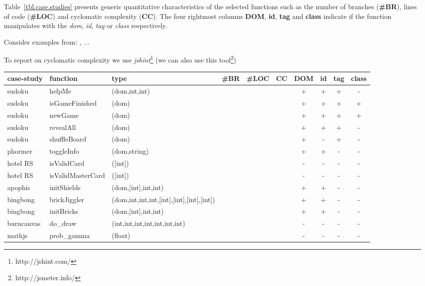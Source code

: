 \documentclass[sigconf]{acmart}
\begin{document}
Table~\ref{tbl.case.studies} presents generic quantitative characteristics of the selected functions such as the number of branches (\textbf{\#BR}), lines of code (\textbf{\#LOC}) and cyclomatic complexity (\textbf{CC}). The four rightmost columns \textbf{DOM}, \textbf{id}, \textbf{tag} and \textbf{class} indicate if the function manipulates with the \emph{dom}, \emph{id}, \emph{tag} or \emph{class} respectively.       


Consider examples from: \cite{artemis2011}, \cite{dom2011}...

To report on cyclomatic complexity we use \emph{jshint}\footnote{http://jshint.com/} (we can also use this tool\footnote{http://jsmeter.info/})

\begin{table*}
  \caption{Summary of the case studies}
  \label{tbl.case.studies}
    \footnotesize
  \begin{tabular}{l|l|l|r|r|r|c|c|c|c}
    \toprule
    \textbf{case-study} & \textbf{function} & \textbf{type} & \textbf{\#BR} & \textbf{\#LOC} & \textbf{CC} & \textbf{DOM} & \textbf{id} & \textbf{tag} & \textbf{class} \\
    \midrule
    sudoku     & helpMe & (dom,int,int) & & & & + & + & + & - \\
    sudoku     & isGameFinished & (dom) & & & & + & + & + & + \\
    sudoku     & newGame & (dom)        & & & & + & + & + & + \\
    sudoku     & revealAll & (dom)      & & & & + & + & + & - \\
    sudoku     & shuffleBoard & (dom)   & & & & + & - & + & - \\
    \midrule
    phormer    & toggleInfo & (dom,string) & & & & + & + & - & - \\
    \midrule
    hotel RS   & isValidCard & ([int]) & & & & - & - & - & - \\
    hotel RS   & isValidMasterCard & ([int])  & & & & - & - & - & - \\
    \midrule
    apophis    & initShields & (dom,[int],int,int) & & & & + & + & - & -\\
    \midrule
    bingbong   & brickJiggler & (dom,int,int,int,[int],[int],[int],[int]) & & & & + & + & - & - \\
    bingbong   & initBricks & (dom,[int],int,int) & & & & + & + & - & - \\
    \midrule
    burncanvas & do\_draw & (int,int,int,int,int,int,int) & & & & - & - & - & - \\
    \midrule
    mathjs     & prob\_gamma & (float) & & & & - & - & - & - \\
    \bottomrule
  \end{tabular}
\end{table*}
\end{document}
